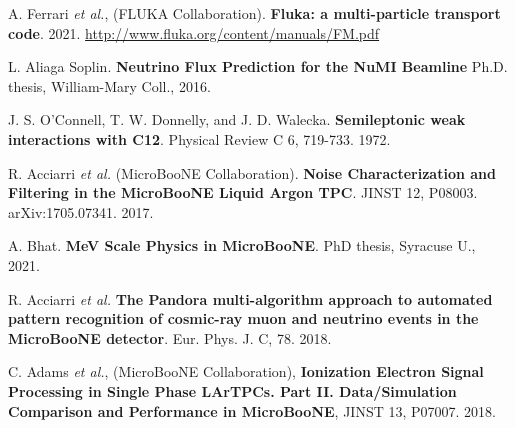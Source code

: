  A. Ferrari \textit{et al.}, (FLUKA Collaboration). \textbf{Fluka:
a multi-particle transport code}. 2021. \href{http://www.fluka.org/content/manuals/FM.pdf
}{http://www.fluka.org/content/manuals/FM.pdf}

 L. Aliaga Soplin. \textbf{Neutrino Flux Prediction for the NuMI Beamline} Ph.D. thesis, William-Mary Coll., 2016.

 J. S. O’Connell, T. W. Donnelly, and J. D. Walecka. \textbf{Semileptonic weak interactions with C12}. Physical Review C 6, 719-733. 1972.

 R. Acciarri \textit{et al.} (MicroBooNE Collaboration). \textbf{Noise Characterization and Filtering in the MicroBooNE Liquid Argon TPC}. JINST 12, P08003. arXiv:1705.07341. 2017. 

 A. Bhat. \textbf{MeV Scale Physics in MicroBooNE}. PhD thesis, Syracuse U., 2021.

 R. Acciarri \textit{et al.} \textbf{The Pandora multi-algorithm approach to automated pattern recognition of cosmic-ray muon and neutrino events in the MicroBooNE detector}. Eur. Phys. J. C, 78. 2018.

 C. Adams \textit{et al.}, (MicroBooNE Collaboration), \textbf{Ionization Electron Signal Processing in Single Phase LArTPCs. Part II. Data/Simulation Comparison and Performance in MicroBooNE}, JINST 13, P07007. 2018.